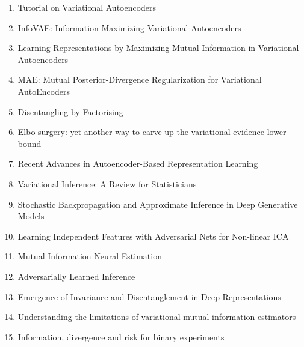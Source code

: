 \documentclass[acmlarge]{acmart}
\begin{document}
\begin{enumerate}
	\item Tutorial on Variational Autoencoders \cite{Doersch2016TutorialOV} 

	\item InfoVAE: Information Maximizing Variational Autoencoders \cite{zhao2017infovae} 

	\item Learning Representations by Maximizing Mutual Information in Variational Autoencoders \cite{LotfiRezaabad2020LearningRB} 

	\item MAE: Mutual Posterior-Divergence Regularization for Variational AutoEncoders \cite{Ma2019MAEMP} 

	\item Disentangling by Factorising \cite{Kim2018DisentanglingBF} 

	\item Elbo surgery: yet another way to carve up the variational evidence lower bound \cite{hoffman2016elbo} 

	\item Recent Advances in Autoencoder-Based Representation Learning \cite{Tschannen2018RecentAI} 

	\item Variational Inference: A Review for Statisticians \cite{Blei2016VariationalIA} 

	\item Stochastic Backpropagation and Approximate Inference in Deep Generative Models \cite{Rezende2014StochasticBA} 

	\item Learning Independent Features with Adversarial Nets for Non-linear ICA \cite{Brakel2018LearningIF} 

	\item Mutual Information Neural Estimation \cite{Belghazi2018MutualIN} 

	\item Adversarially Learned Inference \cite{Dumoulin2017AdversariallyLI} 

	\item Emergence of Invariance and Disentanglement in Deep Representations \cite{Achille2018EmergenceOI} 

	\item Understanding the limitations of variational mutual information estimators \cite{song2019understanding} 

	\item Information, divergence and risk for binary experiments \cite{reid2011information} 


\end{enumerate}
\end{document}
